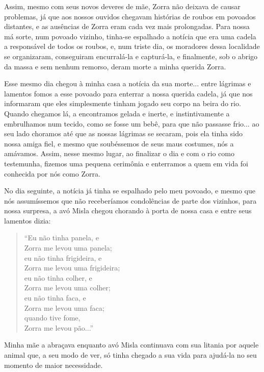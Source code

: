 Assim, mesmo com seus novos deveres de mãe, Zorra não deixava de causar problemas, já que aos nossos ouvidos chegavam histórias de roubos em povoados distantes, e as ausências de Zorra eram cada vez mais prolongadas.
Para nossa má sorte, num povoado vizinho, tinha-se espalhado a notícia que era uma cadela a responsável de todos os roubos, e, num triste dia, os moradores dessa localidade se organizaram, conseguiram encurralá-la e capturá-la, e finalmente, sob o abrigo da massa e sem nenhum remorso, deram morte a minha querida Zorra.

Esse mesmo dia chegou à minha casa a notícia da sua morte... entre lágrimas e lamentos fomos a esse povoado para enterrar a nossa querida cadela, já que nos informaram que eles simplesmente tinham jogado seu corpo na beira do rio. Quando chegamos lá, a encontramos gelada e inerte, e instintivamente a embrulhamos num tecido, como se fosse um bebê, para que não passasse frio... ao seu lado choramos até que as nossas lágrimas se secaram, pois ela tinha sido nossa amiga fiel, e mesmo que soubéssemos de  seus maus costumes, nós a amávamos.
Assim, nesse mesmo lugar, ao finalizar o dia e com o rio como testemunha, fizemos uma pequena cerimônia e enterramos a quem em vida foi conhecida por nós como Zorra. 

No dia seguinte, a notícia já tinha se espalhado pelo meu povoado, e mesmo que nós assumíssemos que não receberíamos condolências de parte dos vizinhos, para nossa surpresa, a avó Misla chegou chorando à porta de nossa casa e entre seus lamentos dizia:
\begin{quotation}
\noindent ``Eu não tinha panela, e \\Zorra me levou uma panela;\\ 
eu não tinha frigideira, e \\Zorra me levou uma frigideira;\\ 
eu não tinha colher, e \\Zorra me levou uma colher;\\
eu não tinha faca, e \\Zorra me levou uma faca;\\
quando tive fome, \\Zorra me levou pão...''
\end{quotation}
Minha mãe a abraçava enquanto avó Misla continuava com sua litania por aquele animal que, a seu modo de ver, só tinha chegado a sua vida para ajudá-la no seu momento de maior necessidade.
 

